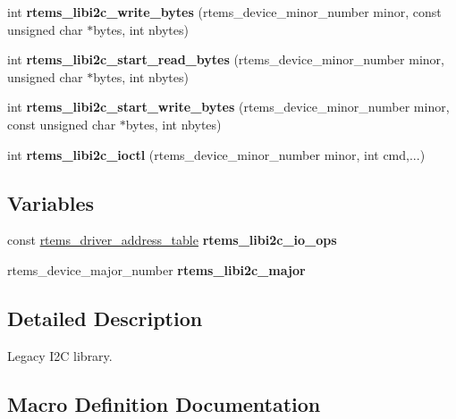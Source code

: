 \begin{DoxyCompactItemize}
\item 
\mbox{\label{group__libi2c_ga93b3f8fb8cdfe32899fc0a01bff2e95e}} 
int {\bfseries rtems\+\_\+libi2c\+\_\+write\+\_\+bytes} (rtems\+\_\+device\+\_\+minor\+\_\+number minor, const unsigned char $\ast$bytes, int nbytes)
\item 
\mbox{\label{group__libi2c_ga98b9984cce81d17df6d5877583e8a1d4}} 
int {\bfseries rtems\+\_\+libi2c\+\_\+start\+\_\+read\+\_\+bytes} (rtems\+\_\+device\+\_\+minor\+\_\+number minor, unsigned char $\ast$bytes, int nbytes)
\item 
\mbox{\label{group__libi2c_gafbc0edbf83add84bd850bb49089861aa}} 
int {\bfseries rtems\+\_\+libi2c\+\_\+start\+\_\+write\+\_\+bytes} (rtems\+\_\+device\+\_\+minor\+\_\+number minor, const unsigned char $\ast$bytes, int nbytes)
\item 
\mbox{\label{group__libi2c_gadad56d445aaa2d100527c3941fadc2de}} 
int {\bfseries rtems\+\_\+libi2c\+\_\+ioctl} (rtems\+\_\+device\+\_\+minor\+\_\+number minor, int cmd,...)
\end{DoxyCompactItemize}
\subsection*{Variables}
\begin{DoxyCompactItemize}
\item 
\mbox{\label{group__libi2c_gab1eb4345d50b6db64dfa11fb0d787570}} 
const \mbox{\hyperlink{structrtems__driver__address__table}{rtems\+\_\+driver\+\_\+address\+\_\+table}} {\bfseries rtems\+\_\+libi2c\+\_\+io\+\_\+ops}
\item 
\mbox{\label{group__libi2c_gaff754f23b2f2fb03ca39a998d26cd893}} 
rtems\+\_\+device\+\_\+major\+\_\+number {\bfseries rtems\+\_\+libi2c\+\_\+major}
\end{DoxyCompactItemize}


\subsection{Detailed Description}
Legacy I2C library. 



\subsection{Macro Definition Documentation}
\mbox{\label{group__libi2c_gaf584b083f554d0cb0565aefd320ed61b}} 
